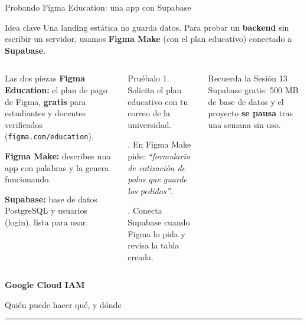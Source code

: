 \documentclass[aspectratio=169,10pt,c]{beamer}
\begin{document}
\begin{frame}{Probando Figma Education: una app con Supabase}
\begin{block}{Idea clave}
\small Una landing estática no guarda datos. Para probar un \textbf{backend} sin escribir un servidor, usamos \textbf{Figma Make} (con el plan educativo) conectado a \textbf{Supabase}.
\end{block}
\begin{columns}[T,onlytextwidth]
\begin{exampleblock}{Las dos piezas}
\small
\textbf{Figma Education:} el plan de pago de Figma, \textbf{gratis} para estudiantes y docentes verificados (\texttt{figma.com/education}).\par\smallskip
\textbf{Figma Make:} describes una app con palabras y la genera funcionando.\par\smallskip
\textbf{Supabase:} base de datos PostgreSQL y usuarios (login), lista para usar.
\end{exampleblock}
\begin{block}{Pruébalo}
\small
1. Solicita el plan educativo con tu correo de la universidad.\par{}. En Figma Make pide: \emph{``formulario de cotización de polos que guarde los pedidos''}.\par{}. Conecta Supabase cuando Figma lo pida y revisa la tabla creada.
\end{block}
\begin{alertblock}{Recuerda la Sesión 13}
\small Supabase gratis: 500 MB de base de datos y el proyecto \textbf{se pausa} tras una semana sin uso.
\end{alertblock}
\end{columns}
\end{frame}

\begin{frame}[plain]
\vfill
\begin{center}
{\fontsize{29}{34}\selectfont\bfseries Google Cloud IAM}\par
\vspace{2mm}
{\small Quién puede hacer qué, y dónde}\par
\vspace{4mm}
{\color{utpRojo}\rule{8.5cm}{1.2pt}}
\end{center}
\vfill
\end{frame}
\end{document}
